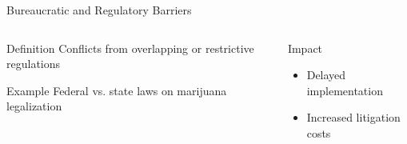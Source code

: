 \documentclass{beamer}  %
\begin{document}
\begin{frame}{Bureaucratic and Regulatory Barriers}
    \begin{columns}[T]
        \begin{column}{0.6\textwidth}
            \begin{block}{Definition}
                Conflicts from overlapping or restrictive regulations
            \end{block}
            
            \begin{exampleblock}{Example}
                Federal vs. state laws on marijuana legalization
            \end{exampleblock}
        \end{column}
        \begin{column}{0.4\textwidth}
            \begin{alertblock}{Impact}
                \begin{itemize}
                    \item Delayed implementation
                    \item Increased litigation costs
                \end{itemize}
            \end{alertblock}
        \end{column}
    \end{columns}
\end{frame}
\end{document}
